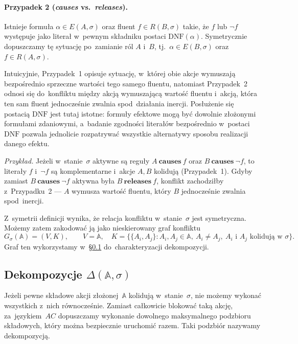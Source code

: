 \documentclass[11pt,a4paper]{article}
\newcommand{\causes}{\textbf{causes}}
\newcommand{\releases}{\textbf{releases}}
\newcommand{\DNF}{\mathrm{DNF}}
\theoremstyle{definition}
\begin{document}
\paragraph{Przypadek 2 (\textit{causes} vs.\ \textit{releases}).}
Istnieje formuła $\alpha \in E(A,\sigma)$ oraz fluent $f \in R(B,\sigma)$
takie, że $f$ lub $\neg f$ występuje jako literał w~pewnym składniku
postaci $\DNF(\alpha)$. Symetrycznie dopuszczamy tę sytuację po~zamianie
ról $A$ i~$B$, tj.\ $\alpha \in E(B,\sigma)$ oraz $f \in R(A,\sigma)$.

\medskip
Intuicyjnie, Przypadek~1 opisuje sytuację, w~której obie akcje wymuszają
bezpośrednio sprzeczne wartości tego samego fluentu, natomiast Przypadek~2
odnosi się do~konfliktu między akcją wymuszającą wartość fluentu i~akcją,
która ten sam fluent jednocześnie zwalnia spod~działania inercji.
Posłużenie się postacią $\DNF$ jest tutaj istotne: formuły efektowe mogą
być dowolnie złożonymi formułami zdaniowymi, a~badanie zgodności literałów
bezpośrednio w~postaci $\DNF$ pozwala jednolicie rozpatrywać wszystkie
alternatywy sposobu realizacji danego efektu.

\smallskip\noindent\emph{Przykład.}
Jeżeli w~stanie~$\sigma$ aktywne są reguły $A\ \causes\ f$ oraz $B\ \causes\ \neg f$,
to literały $f$ i~$\neg f$ są komplementarne i~akcje $A, B$ kolidują (Przypadek~1).
Gdyby zamiast $B\ \causes\ \neg f$ aktywna była $B\ \releases\ f$, konflikt zachodziłby
z~Przypadku~2 --- $A$ wymusza wartość fluentu, który $B$ jednocześnie zwalnia spod~inercji.

Z~symetrii definicji wynika, że relacja konfliktu w~stanie~$\sigma$
jest symetryczna. Możemy zatem zakodować ją jako nieskierowany graf
konfliktu
\[
  G_\sigma(\mathbb{A}) = (V, K),
  \qquad V = \mathbb{A},
  \quad
  K = \{\{A_i, A_j\} : A_i, A_j \in \mathbb{A},\ A_i \neq A_j,
        \ A_i \text{ i } A_j \text{ kolidują w~} \sigma\}.
\]
Graf ten wykorzystamy w~\S\ref{sec:dekompozycje} do~charakteryzacji
dekompozycji.

\subsection{Dekompozycje \texorpdfstring{$\Delta(\mathbb{A}, \sigma)$}{Delta(A,sigma)}}
\label{sec:dekompozycje}

Jeżeli pewne składowe akcji złożonej~$\mathbb{A}$ kolidują w~stanie~$\sigma$,
nie możemy wykonać wszystkich z~nich równocześnie. Zamiast całkowicie
blokować taką akcję, za~językiem~$AC$ dopuszczamy wykonanie dowolnego
maksymalnego podzbioru składowych, który można bezpiecznie uruchomić
razem. Taki podzbiór nazywamy dekompozycją.
\end{document}
